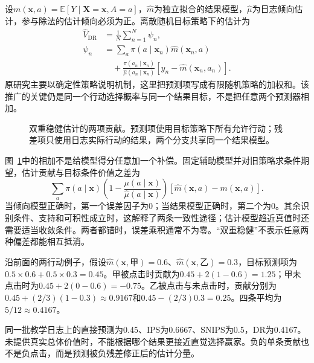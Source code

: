 设$m(\bm x,a)=\mathbb E[Y\mid\bm X=\bm x,A=a]$，$\widehat m$为独立拟合的结果模型，$\widehat\mu$为日志倾向估计，参与除法的估计倾向必须为正。离散随机目标策略下的估计为
\begin{equation}
  \begin{aligned}
    \widehat V_{\mathrm{DR}}
      &=\frac1N\sum_{n=1}^{N}\psi_n,\\
    \psi_n
      &=\sum_a\pi(a\mid\bm x_n)\widehat m(\bm x_n,a)\\
      &\quad+
       \frac{\pi(a_n\mid\bm x_n)}{\widehat\mu(a_n\mid\bm x_n)}
       \left[y_n-\widehat m(\bm x_n,a_n)\right].
  \end{aligned}
  \label{eq:rs-evaluation-dr}
\end{equation}
原研究主要以确定性策略说明机制，这里把预测项写成有限随机策略的加权和。该推广的关键仍是同一个行动选择概率与同一个结果目标，不是把任意两个预测器相加。

\begin{figure}[htbp]
  \centering
  
  \caption{双重稳健估计的两项贡献。预测项使用目标策略下所有允许行动；残差项只使用日志实际行动的结果，两个分支共享同一个结果模型。}
  \label{fig:rs-evaluation-dr}
\end{figure}

图~\ref{fig:rs-evaluation-dr}中的相加不是给模型得分任意加一个补偿。固定辅助模型并对旧策略求条件期望，估计贡献与目标条件价值之差为
\begin{equation}
  \sum_a\pi(a\mid\bm x)
    \left(1-\frac{\mu(a\mid\bm x)}
                     {\widehat\mu(a\mid\bm x)}\right)
    \left[\widehat m(\bm x,a)-m(\bm x,a)\right].
  \label{eq:rs-evaluation-dr-bias}
\end{equation}
当倾向模型正确时，第一个误差因子为0；当结果模型正确时，第二个为0。其余识别条件、支持和可积性成立时，这解释了两条一致性途径；估计模型趋近真值时还需要适当收敛条件。两者都错时，误差乘积通常不为零。“双重稳健”不表示任意两种偏差都能相互抵消。

沿前面的两行动例子，假设$\widehat m(\bm x,\text{甲})=0.6$、$\widehat m(\bm x,\text{乙})=0.3$，目标预测项为$0.5\times0.6+0.5\times0.3=0.45$。甲被点击时贡献为$0.45+2(1-0.6)=1.25$；甲未点击时为$0.45+2(0-0.6)=-0.75$。乙被点击与未点击时，贡献分别为$0.45+(2/3)(1-0.3)\approx0.9167$和$0.45-(2/3)0.3=0.25$。四条平均为$5/12\approx0.4167$。

同一批教学日志上的直接预测为0.45、IPS为0.6667、SNIPS为0.5，DR为0.4167。未提供真实总体价值时，不能根据哪个结果更接近直觉选择赢家。负的单条贡献也不是负点击，而是预测被负残差修正后的估计分量。

